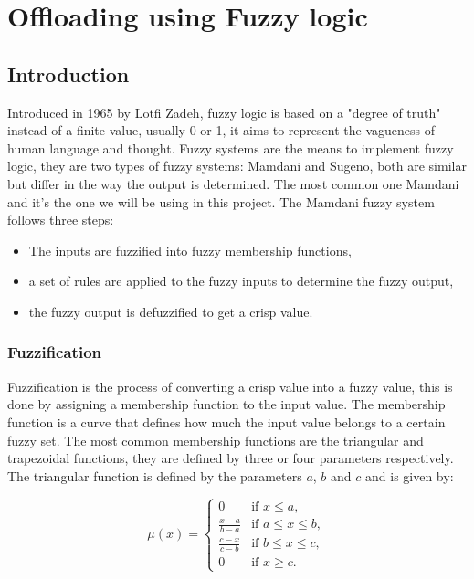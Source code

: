 \chapter{Offloading using Fuzzy logic}
\label{chap:fuzzy}

\section{Introduction}

Introduced in 1965 by Lotfi Zadeh\cite{zadeh-1965}, fuzzy logic is based on a "degree of truth" instead of a finite
value, usually 0 or 1, it aims to represent the vagueness of human language and thought. Fuzzy systems are the means
to implement fuzzy logic, they are two types of fuzzy systems: Mamdani and Sugeno, both are similar but differ in the
way the output is determined. The most common one Mamdani and it's the one we will be using in this project. The
Mamdani fuzzy system follows three steps:

\begin{itemize}
	\item The inputs are fuzzified into fuzzy membership functions,
	\item a set of rules are applied to the fuzzy inputs to determine the fuzzy output,
	\item the fuzzy output is defuzzified to get a crisp value.
\end{itemize}

\subsection{Fuzzification}

Fuzzification is the process of converting a crisp value into a fuzzy value, this is done by assigning a membership
function to the input value. The membership function is a curve that defines how much the input value belongs to a
certain fuzzy set. The most common membership functions are the triangular and trapezoidal functions, they are defined
by three or four parameters respectively. The triangular function is defined by the parameters $a$, $b$ and $c$ and
is given by:

\begin{equation}
	\mu(x) = \begin{cases}
		0                   & \text{if } x \leq a,        \\
		\frac{x - a}{b - a} & \text{if } a \leq x \leq b, \\
		\frac{c - x}{c - b} & \text{if } b \leq x \leq c, \\
		0                   & \text{if } x \geq c.
	\end{cases}
\end{equation}

